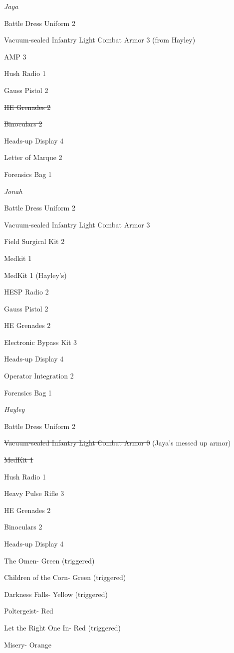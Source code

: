 \textit{Jaya}

{\parskip=0pt
Battle Dress Uniform 2

Vacuum-sealed Infantry Light Combat Armor 3 (from Hayley)

AMP 3

Hush Radio 1

Gauss Pistol 2

\sout{ HE Grenades 2 }

\sout{ Binoculars 2 }

Heads-up Display 4

Letter of Marque 2

Forensics Bag 1
}


\textit{Jonah}

{\parskip=0pt
Battle Dress Uniform 2

Vacuum-sealed Infantry Light Combat Armor 3

Field Surgical Kit 2

Medkit 1

MedKit 1 (Hayley's)

HESP Radio 2

Gauss Pistol 2

HE Grenades 2

Electronic Bypass Kit 3

Heads-up Display 4

Operator Integration 2

Forensics Bag 1
}


\textit{Hayley}

{\parskip=0pt
Battle Dress Uniform 2

\sout{ Vacuum-sealed Infantry Light Combat Armor 0 } (Jaya's messed up armor)

\sout{ MedKit 1 }

Hush Radio 1

Heavy Pulse Rifle 3

HE Grenades 2

Binoculars 2

Heads-up Display 4
}


{\parskip=0pt
The Omen- Green (triggered)

Children of the Corn- Green (triggered)

Darkness Falls- Yellow (triggered)

Poltergeist- Red

Let the Right One In- Red (triggered)

Misery- Orange
}

